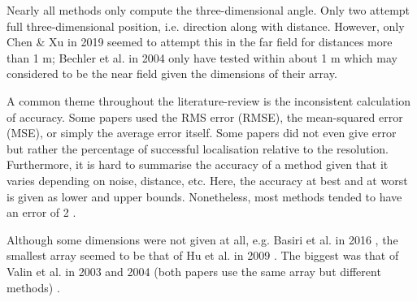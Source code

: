 \documentclass{report}
\begin{document}
%

Nearly all methods only compute the three-dimensional angle. Only two attempt full three-dimensional position, i.e. direction along with distance. However, only Chen \& Xu in 2019 \cite{chen_sound_2019} seemed to attempt this in the far field for distances more than 1 \si{m}; Bechler et al. in 2004 \cite{bechler_system_2004} only have tested within about 1 \si{m} which may considered to be the near field given the dimensions of their array.

A common theme throughout the literature-review is the inconsistent calculation of accuracy. Some papers used the RMS error (RMSE), the mean-squared error (MSE), or simply the average error itself. Some papers did not even give error but rather the percentage of successful localisation relative to the resolution. Furthermore, it is hard to summarise the accuracy of a method given that it varies depending on noise, distance, etc. Here, the accuracy at best and at worst is given as lower and upper bounds. Nonetheless, most methods tended to have an error of 2 \si{\deg}.

Although some dimensions were not given at all, e.g. Basiri et al. in 2016 \cite{basiri_-board_2016}, the smallest array seemed to be that of Hu et al. in 2009 \cite{hu_estimation_2009}. The biggest was that of Valin et al. in 2003 and 2004 (both papers use the same array but different methods) \cite{valin_robust_2003} \cite{valin_localization_2004}.
\end{document}
